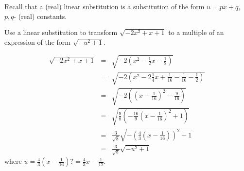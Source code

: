 \begin{frame}
Recall that a (real) linear substitution is a substitution of the form $u=px+q$, $p,q$- (real) constants.
\begin{example}
Use a linear substitution to transform $\sqrt{-2x^2+x+1}$ to a multiple of an expression of the form $\sqrt{-u^2+1}$. 

\[
\begin{array}{rcl}
\sqrt{-2x^2+x+1}&=&\sqrt{ -2\left(x^2-\frac{1}{2}x -\frac{1}{2}\right) } \\
&=& \sqrt{ -2\left(x^2-2\frac{1}{4}x +\frac{1}{16}-\frac{1}{16}-\frac{1}{2}\right) }\\
&=&\sqrt{-2\left(\left(x-\frac{1}{16}\right)^2-\frac{9}{16} \right)}\\
&=&\sqrt{\frac{9}{8}\left(-\frac{16}{9}\left(x-\frac{1}{16}\right)^2+1 \right)}\\
&=&\frac{3}{\sqrt{8}}\sqrt{-\left(\frac{4}{3}\left(x-\frac{1}{16}\right)\right)^2+1 }\\
&=&\frac{ 3}{\sqrt{8}} \sqrt{-u^2+1}
\end{array}
\]
where $u=\frac{4}{3}\left(x-\frac{1}{16}\right)  \textbf{?}=\frac{4}{3}x-\frac{1}{12}$.
\end{example}
\end{frame}
